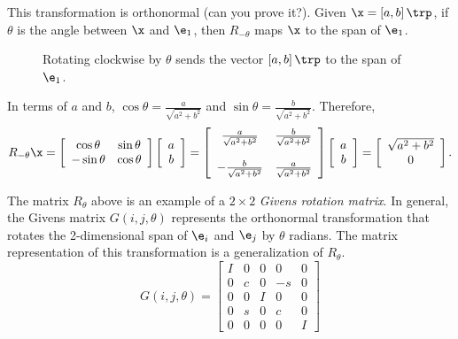 This transformation is orthonormal (can you prove it?).
Given $\x = \left[a, b\right]\trp$, if $\theta$ is the angle between $\x$ and $\e_1$, then $R_{-\theta}$ maps $\x$ to the span of $\e_1$.

\begin{figure}[H]
\centering
{}
\caption{Rotating clockwise by $\theta$ sends the vector $\left[a,b\right]\trp$ to the span of $\e_1$.}
\label{fig:Givens-rotation}
\end{figure}

In terms of $a$ and $b$, $\cos \theta =  \frac{a}{\sqrt{a^2+b^2}}$ and $\sin\theta = \frac{b}{\sqrt{a^2+b^2}}$.
Therefore,
\[
R_{-\theta}\x
=
\left[\begin{array}{cc}
\cos\theta  & \sin\theta \\
-\sin\theta & \cos\theta \\
\end{array}\right]
\left[\begin{array}{c} a \\ b \end{array}\right]
=
\left[\begin{array}{cc}
 \frac{a}{\sqrt{a^2+b^2}} & \frac{b}{\sqrt{a^2+b^2}} \\ \\
-\frac{b}{\sqrt{a^2+b^2}} & \frac{a}{\sqrt{a^2+b^2}} \\
\end{array}\right]
\left[\begin{array}{c} a \\ b \end{array}\right]
=
\left[\begin{array}{c} \sqrt{a^2+b^2} \\ 0 \end{array}\right].
\]

The matrix $R_{\theta}$ above is an example of a $2 \times 2$ \emph{Givens rotation matrix}.
In general, the Givens matrix $G(i,j,\theta)$ represents the orthonormal transformation that rotates the 2-dimensional span of $\e_i$ and $\e_j$ by $\theta$ radians.
The matrix representation of this transformation is a generalization of $R_\theta$.
\[
G(i,j,\theta) =
\left[\begin{array}{ccccc}
I & 0 & 0 & 0 & 0 \\
0 & c & 0 & -s & 0 \\
0 & 0 & I & 0 & 0 \\
0 & s & 0 & c & 0 \\
0 & 0 & 0 & 0 & I
\end{array}\right]
\]

